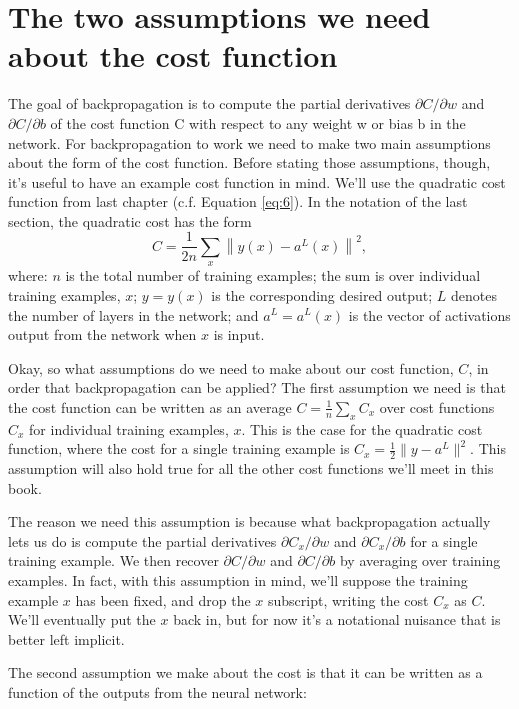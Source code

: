 \documentclass[a4paper,twoside,10pt]{book}
\begin{document}
\section{The two assumptions we need about the cost function}
The goal of backpropagation is to compute the partial derivatives $\partial{}C/\partial{}w$ and $\partial{}C/\partial{}b$ of the cost function C with respect to any weight w or bias b in the network. For backpropagation to work we need to make two main assumptions about the form of the cost function. Before stating those assumptions, though, it's useful to have an example cost function in mind. We'll use the quadratic cost function from last chapter (c.f. Equation \ref{eq:6}). In the notation of the last section, the quadratic cost has the form
\begin{equation}
C = \frac{1}{2n} \sum_x \left\|y(x)-a^L(x)\right\|^2,
\tag{26}\label{eq:26}
\end{equation}
where: $n$ is the total number of training examples; the sum is over individual training examples, $x$; $y=y(x)$ is the corresponding desired output; $L$ denotes the number of layers in the network; and $a^L=a^L(x)$ is the vector of activations output from the network when $x$ is input.

Okay, so what assumptions do we need to make about our cost function, $C$, in order that backpropagation can be applied? The first assumption we need is that the cost function can be written as an average $C=\frac1n\sum_xC_x$ over cost functions $C_x$ for individual training examples, $x$. This is the case for the quadratic cost function, where the cost for a single training example is $C_x=\frac12\|y-a^L\|^2$. This assumption will also hold true for all the other cost functions we'll meet in this book.

The reason we need this assumption is because what backpropagation actually lets us do is compute the partial derivatives $\partial{}C_x/\partial{}w$ and $\partial{}C_x/\partial{}b$ for a single training example. We then recover $\partial{}C/\partial{}w$ and $\partial{}C/\partial{}b$ by averaging over training examples. In fact, with this assumption in mind, we'll suppose the training example $x$ has been fixed, and drop the $x$ subscript, writing the cost $C_x$ as $C$. We'll eventually put the $x$ back in, but for now it's a notational nuisance that is better left implicit.

The second assumption we make about the cost is that it can be written as a function of the outputs from the neural network:
\end{document}
